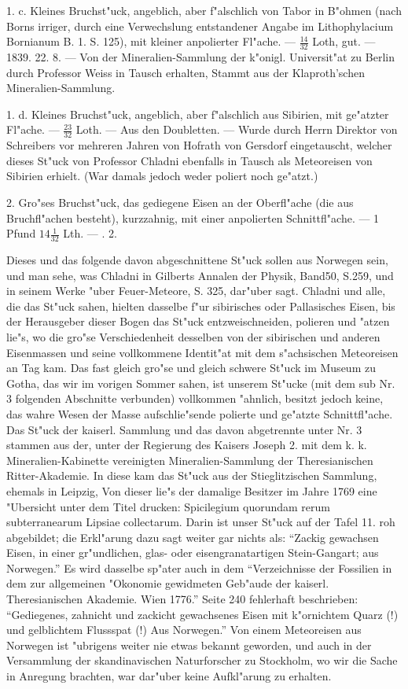 \documentclass[a4paper, 11pt, oneside, polutonikogreek, german]{article}
\begin{document}
1. c. Kleines Bruchst"uck, angeblich, aber f"alschlich von Tabor in B"ohmen (nach Borns irriger, durch eine Verwechslung entstandener Angabe im Lithophylacium Bornianum B. 1. S. 125), mit kleiner anpolierter Fl"ache. --- $\frac{14}{32}$ Loth, gut. --- 1839. 22. 8. --- Von der Mineralien-Sammlung der k"onigl. Universit"at zu Berlin durch Professor Weiss in Tausch erhalten, Stammt aus der Klaproth'schen Mineralien-Sammlung.

1. d. Kleines Bruchst"uck, angeblich, aber f"alschlich aus Sibirien, mit ge"atzter Fl"ache. --- $\frac{23}{32}$ Loth. --- Aus den Doubletten. --- Wurde durch Herrn Direktor von Schreibers vor mehreren Jahren von Hofrath von Gersdorf eingetauscht, welcher dieses St"uck von Professor Chladni ebenfalls in Tausch als Meteoreisen von Sibirien erhielt. (War damals jedoch weder poliert noch ge"atzt.)

2. Gro"ses Bruchst"uck, das gediegene Eisen an der Oberfl"ache (die aus Bruchfl"achen besteht), kurzzahnig, mit einer anpolierten Schnittfl"ache. --- 1 Pfund $14\frac{1}{32}$ Lth. --- . 2.

Dieses und das folgende davon abgeschnittene St"uck sollen aus Norwegen sein, und man sehe, was Chladni in Gilberts Annalen der Physik, Band50, S.259, und in seinem Werke "uber Feuer-Meteore, S. 325, dar"uber sagt. Chladni und alle, die das St"uck sahen, hielten dasselbe f"ur sibirisches oder Pallasisches Eisen, bis der Herausgeber dieser Bogen das St"uck entzweischneiden, polieren und "atzen lie"s, wo die gro"se Verschiedenheit desselben von der sibirischen und anderen Eisenmassen und seine vollkommene Identit"at mit dem s"achsischen Meteoreisen an Tag kam. Das fast gleich gro"se und gleich schwere St"uck im Museum zu Gotha, das wir im vorigen Sommer sahen, ist unserem St"ucke (mit dem sub Nr. 3 folgenden Abschnitte verbunden) vollkommen "ahnlich, besitzt jedoch keine, das wahre Wesen der Masse aufschlie"sende polierte und ge"atzte Schnittfl"ache. Das St"uck der kaiserl. Sammlung und das davon abgetrennte unter Nr. 3 stammen aus der, unter der Regierung des Kaisers Joseph 2. mit dem k. k. Mineralien-Kabinette vereinigten Mineralien-Sammlung der Theresianischen Ritter-Akademie. In diese kam das St"uck aus der Stieglitzischen Sammlung, ehemals in Leipzig, Von dieser lie"s der damalige Besitzer im Jahre 1769 eine "Ubersicht unter dem Titel drucken: Spicilegium quorundam rerum subterranearum Lipsiae collectarum. Darin ist unser St"uck auf der Tafel 11. roh abgebildet; die Erkl"arung dazu sagt weiter gar nichts als: "`Zackig gewachsen Eisen, in einer gr"undlichen, glas- oder eisengranatartigen Stein-Gangart; aus Norwegen."' Es wird dasselbe sp"ater auch in dem "`Verzeichnisse der Fossilien in dem zur allgemeinen "Okonomie gewidmeten Geb"aude der kaiserl. Theresianischen Akademie. Wien 1776."' Seite 240 fehlerhaft beschrieben: "`Gediegenes, zahnicht und zackicht gewachsenes Eisen mit k"ornichtem Quarz (!) und gelblichtem Flussspat (!) Aus Norwegen."' Von einem Meteoreisen aus Norwegen ist "ubrigens weiter nie etwas bekannt geworden, und auch in der Versammlung der skandinavischen Naturforscher zu Stockholm, wo wir die Sache in Anregung brachten, war dar"uber keine Aufkl"arung zu erhalten.
\end{document}
